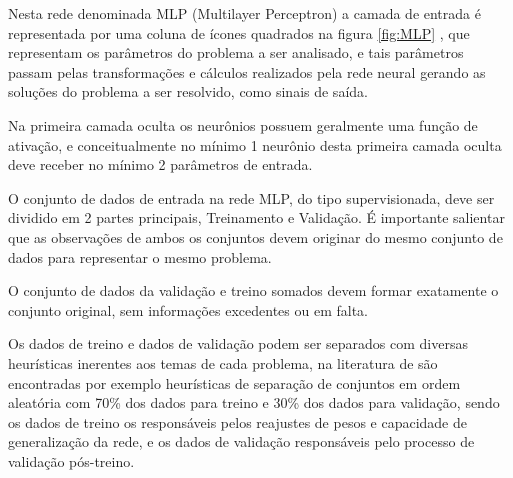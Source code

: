   	       \begin{figure}[H]
  	       \end{figure}
         
  	       Nesta rede denominada MLP (Multilayer Perceptron) a camada de entrada é representada por uma coluna de ícones quadrados na figura \ref{fig:MLP} , que representam os parâmetros do problema a ser analisado, e tais parâmetros passam pelas transformações e cálculos realizados pela rede neural gerando as soluções do problema a ser resolvido, como sinais de saída.
  	      
  	       Na primeira camada oculta os neurônios possuem geralmente uma função de ativação, e conceitualmente no mínimo 1 neurônio desta primeira camada oculta deve receber no mínimo 2 parâmetros de entrada.
  	       
            	O conjunto de dados de entrada na rede MLP, do tipo supervisionada, deve ser dividido em 2 partes principais, Treinamento e Validação. É importante salientar que as observações de ambos os conjuntos devem originar do mesmo conjunto de dados para representar o mesmo problema.
            	
            	O conjunto de dados da validação e treino somados devem formar exatamente o conjunto original, sem informações excedentes ou em falta.
            	
            	Os dados de treino e dados de validação podem ser separados com diversas heurísticas inerentes aos temas de cada problema, na literatura de \cite{DLB} são encontradas por exemplo heurísticas de separação de conjuntos em ordem aleatória com 70\% dos dados para treino e 30\% dos dados para validação, sendo os dados de treino os responsáveis pelos reajustes de pesos e capacidade de generalização da rede, e os dados de validação responsáveis pelo processo de validação pós-treino.
            	
